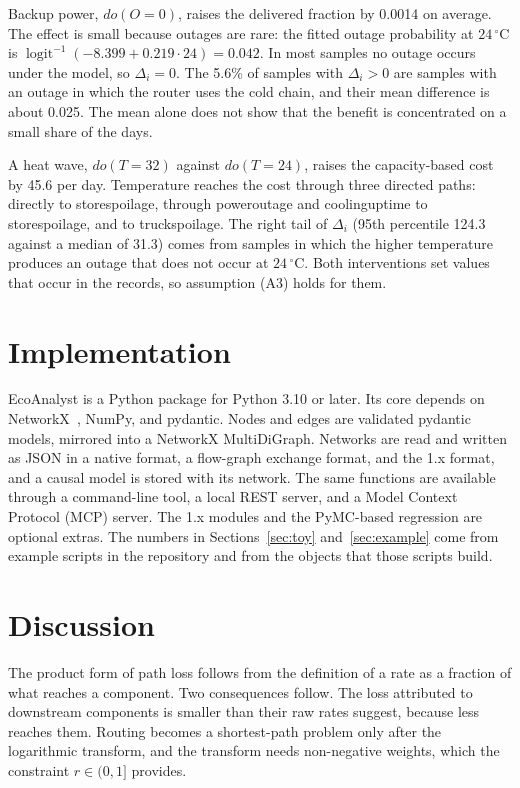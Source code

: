 \documentclass[12pt]{article}
\DeclareMathOperator{\logit}{logit}
\newcommand{\expit}{\logit^{-1}}
\newcommand{\code}[1]{{\ttfamily\def\_{\textunderscore\allowbreak}#1}}
\theoremstyle{plain}
\theoremstyle{definition}
\begin{document}
Backup power, $do(O=0)$, raises the delivered fraction by 0.0014 on average. The effect is small because outages are rare: the fitted outage probability at $24\,^\circ$C is $\expit(-8.399+0.219\cdot 24)=0.042$. In most samples no outage occurs under the model, so $\Delta_i=0$. The 5.6\% of samples with $\Delta_i>0$ are samples with an outage in which the router uses the cold chain, and their mean difference is about 0.025. The mean alone does not show that the benefit is concentrated on a small share of the days.

A heat wave, $do(T=32)$ against $do(T=24)$, raises the capacity-based cost by 45.6 per day. Temperature reaches the cost through three directed paths: directly to \code{store\_spoilage}, through \code{power\_outage} and \code{cooling\_uptime} to \code{store\_spoilage}, and to \code{truck\_spoilage}. The right tail of $\Delta_i$ (95th percentile 124.3 against a median of 31.3) comes from samples in which the higher temperature produces an outage that does not occur at $24\,^\circ$C. Both interventions set values that occur in the records, so assumption (A3) holds for them.

\section{Implementation}\label{sec:impl}

EcoAnalyst is a Python package for Python 3.10 or later. Its core depends on NetworkX~\cite{networkx}, NumPy, and pydantic. Nodes and edges are validated pydantic models, mirrored into a NetworkX \code{MultiDiGraph}. Networks are read and written as JSON in a native format, a flow-graph exchange format, and the 1.x format, and a causal model is stored with its network. The same functions are available through a command-line tool, a local REST server, and a Model Context Protocol (MCP) server. The 1.x modules and the PyMC-based regression are optional extras. The numbers in Sections~\ref{sec:toy} and~\ref{sec:example} come from example scripts in the repository and from the objects that those scripts build.

\section{Discussion}\label{sec:discussion}

The product form of path loss follows from the definition of a rate as a fraction of what reaches a component. Two consequences follow. The loss attributed to downstream components is smaller than their raw rates suggest, because less reaches them. Routing becomes a shortest-path problem only after the logarithmic transform, and the transform needs non-negative weights, which the constraint $r\in(0,1]$ provides.
\end{document}
